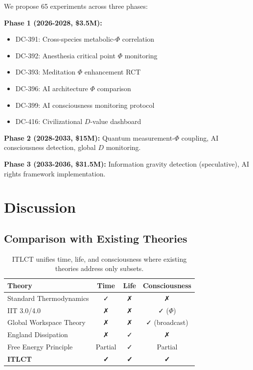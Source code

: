 \documentclass[12pt,a4paper]{article}
\begin{document}
We propose 65 experiments across three phases:

\textbf{Phase 1 (2026-2028, \$3.5M):}
\begin{itemize}
\item DC-391: Cross-species metabolic-$\Phi$ correlation
\item DC-392: Anesthesia critical point $\Phi$ monitoring
\item DC-393: Meditation $\Phi$ enhancement RCT
\item DC-396: AI architecture $\Phi$ comparison
\item DC-399: AI consciousness monitoring protocol
\item DC-416: Civilizational $D$-value dashboard
\end{itemize}

\textbf{Phase 2 (2028-2033, \$15M):} Quantum measurement-$\Phi$ coupling, AI consciousness detection, global $D$ monitoring.

\textbf{Phase 3 (2033-2036, \$31.5M):} Information gravity detection (speculative), AI rights framework implementation.

\section{Discussion}

\subsection{Comparison with Existing Theories}

\begin{table}[h]
\centering
\begin{tabular}{@{}lccc@{}}
\toprule
\textbf{Theory} & \textbf{Time} & \textbf{Life} & \textbf{Consciousness} \\
\midrule
Standard Thermodynamics & ✓ & ✗ & ✗ \\
IIT 3.0/4.0 & ✗ & ✗ & ✓ ($\Phi$) \\
Global Workspace Theory & ✗ & ✗ & ✓ (broadcast) \\
England Dissipation & ✗ & ✓ & ✗ \\
Free Energy Principle & Partial & ✓ & Partial \\
\textbf{ITLCT} & \textbf{✓} & \textbf{✓} & \textbf{✓} \\
\bottomrule
\end{tabular}
\caption{ITLCT unifies time, life, and consciousness where existing theories address only subsets.}
\end{table}
\end{document}
